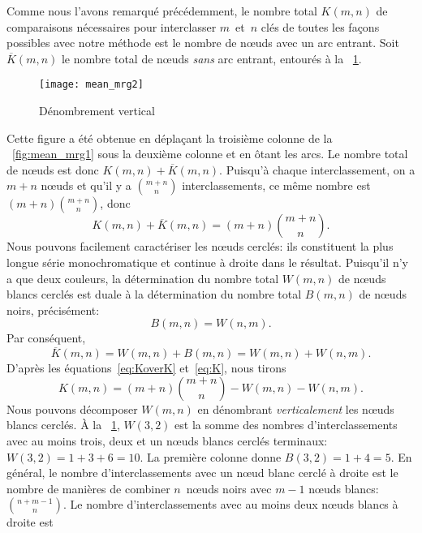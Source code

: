 Comme nous l'avons remarqué précédemment, le nombre total \(K(m,n)\)
de comparaisons nécessaires pour interclasser \(m\)~et~\(n\) clés de
toutes les façons possibles avec notre méthode est le nombre de
nœuds avec un arc entrant. Soit \(\overline{K}(m,n)\) le nombre
total de nœuds \emph{sans} arc entrant, entourés à la
\fig~\ref{fig:mean_mrg2}.
\begin{figure}
\centering
\texttt{[image: mean\_mrg2]}
\caption{Dénombrement vertical}
\label{fig:mean_mrg2}
\end{figure}
Cette figure a été obtenue en déplaçant la troisième colonne de la
\fig~\vref{fig:mean_mrg1} sous la deuxième colonne et en ôtant les
arcs. Le nombre total de nœuds est donc \(K(m,n) +
\overline{K}(m,n)\). Puisqu'à chaque interclassement, on a \(m+n\)
nœuds et qu'il y a \(\binom{m+n}{n}\) interclassements, ce même
nombre est \((m + n) \binom{m+n}{n}\), donc
\begin{equation}
K(m,n) + \overline{K}(m,n) = (m + n) \binom{m+n}{n}.
\label{eq:KoverK}
\end{equation}
Nous pouvons facilement caractériser les nœuds cerclés: ils
constituent la plus longue série monochromatique et continue à droite
dans le résultat. Puisqu'il n'y a que deux couleurs, la détermination
du nombre total \(W(m,n)\) de nœuds blancs cerclés est duale à la
détermination du nombre total \(B(m,n)\) de nœuds noirs,
précisément:
\begin{equation*}
B(m,n) = W(n,m).
\end{equation*}
Par conséquent,
\begin{equation}
\overline{K}(m,n) = W(m,n) + B(m,n) = W(m,n) + W(n,m).
\label{eq:K}
\end{equation}
D'après les équations~\eqref{eq:KoverK} et~\eqref{eq:K}, nous tirons
\begin{equation}
K(m,n) = (m + n) \binom{m+n}{n} - W(m,n) - W(n,m).
\label{eq:K_temp}
\end{equation}
Nous pouvons décomposer \(W(m,n)\) en dénombrant \emph{verticalement}
les nœuds blancs cerclés. À la \fig~\ref{fig:mean_mrg2},
\(W(3,2)\) est la somme des nombres d'interclassements avec au moins
trois, deux et un nœuds blancs cerclés terminaux: \(W(3,2) = 1+ 3
+ 6 = 10\). La première colonne donne \(B(3,2) = 1 + 4 = 5\). En
général, le nombre d'interclassements avec un nœud blanc cerclé à
droite est le nombre de manières de combiner \(n\)~nœuds noirs
avec \(m-1\) nœuds blancs: \(\binom{n+m-1}{n}\). Le nombre
d'interclassements avec au moins deux nœuds blancs à droite est
